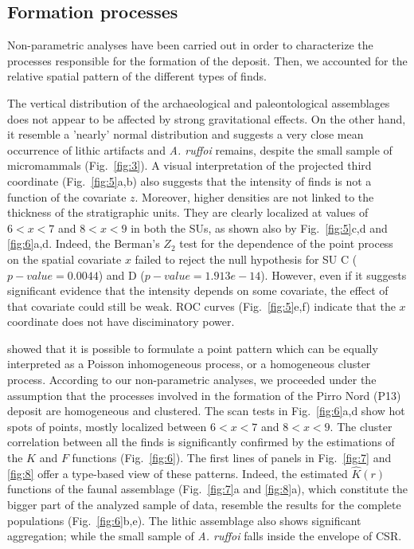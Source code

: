 \documentclass[review,authoryear]{elsarticle} %
\begin{document}
\subsection{Formation processes}

Non-parametric analyses have been carried out in order to characterize the processes responsible for the formation of the deposit. Then, we accounted for the relative spatial pattern of the different types of finds.

The vertical distribution of the archaeological and paleontological assemblages does not appear to be affected by strong gravitational effects. On the other hand, it resemble a 'nearly' normal distribution and suggests a very close mean occurrence of lithic artifacts and \emph{A. ruffoi} remains, despite the small sample of micromammals (Fig.~\ref{fig:3}). A visual interpretation of the projected third coordinate (Fig.~\ref{fig:5}a,b) also suggests that the intensity of finds is not a function of the covariate $z$. Moreover, higher densities are not linked to the thickness of the stratigraphic units. They are clearly localized at values of $6<x<7$ and $8<x<9$ in both the SUs, as shown also by Fig.~\ref{fig:5}c,d and \ref{fig:6}a,d. Indeed, the Berman's $Z_2$ test for the dependence of the point process on the spatial covariate $x$ failed to reject the null hypothesis for SU C ($p-value=0.0044$) and D ($p-value=1.913e-14$). However, even if it suggests significant evidence that the intensity depends on some covariate, the effect of that covariate could still be weak. ROC curves (Fig.~\ref{fig:5}e,f) indicate that the $x$ coordinate does not have disciminatory power.

\cite{Bartlett1963} showed that it is possible to formulate a point pattern which can be equally interpreted as a Poisson inhomogeneous process, or a homogeneous cluster process. According to our non-parametric analyses, we proceeded under the assumption that the processes involved in the formation of the Pirro Nord (P13) deposit are homogeneous and clustered. The scan tests in Fig.~\ref{fig:6}a,d show hot spots of points, mostly localized between $6<x<7$ and $8<x<9$. The cluster correlation between all the finds is significantly confirmed by the estimations of the $K$ and $F$ functions (Fig.~\ref{fig:6}). The first lines of panels in Fig.~\ref{fig:7} and \ref{fig:8} offer a type-based view of these patterns. Indeed, the estimated $\hat K(r)$ functions of the faunal assemblage (Fig.~\ref{fig:7}a and \ref{fig:8}a), which constitute the bigger part of the analyzed sample of data, resemble the results for the complete populations (Fig.~\ref{fig:6}b,e). The lithic assemblage also shows significant aggregation; while the small sample of \emph{A. ruffoi} falls inside the envelope of CSR.
\end{document}
